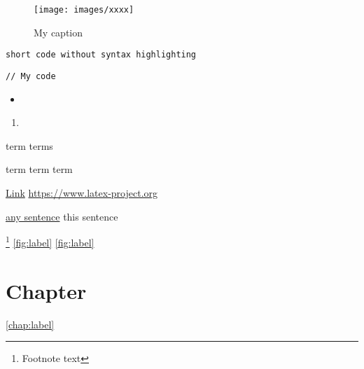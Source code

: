 
\begin{figure}%
	\centering
	\texttt{[image: images/xxxx]}
	\caption{My caption}
	\label{fig:my-label}
\end{figure}



\lstinline|short code without syntax highlighting|

\begin{lstlisting}[language=My language,caption=My caption,label=code:label]
// My code
\end{lstlisting}





\begin{itemize}
	\item 
\end{itemize}

\begin{enumerate}
	\item 
\end{enumerate}



\gls{term}
\glspl{term}

\acrshort{term}
\acrlong{term}
\acrfull{term}



\href{https://www.latex-project.org}{Link}
\url{https://www.latex-project.org}

\hyperlink{link-label}{any sentence} %
\hypertarget{link-label}{this sentence}



\footnote{Footnote text}
\autoref{fig:label} %
\ref{fig:label} %

\chapter{Chapter} \label{chap:label}
\autoref{chap:label}
